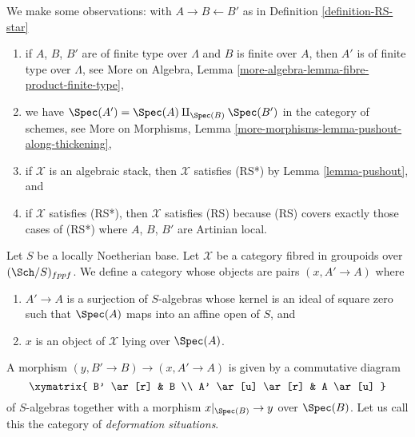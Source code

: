 \noindent
We make some observations:
with $A \to B \leftarrow B'$ as in Definition \ref{definition-RS-star}
\begin{enumerate}
\item if $A$, $B$, $B'$ are of finite type over $\Lambda$ and
$B$ is finite over $A$, then $A'$ is of finite type over $\Lambda$, see
More on Algebra, Lemma \ref{more-algebra-lemma-fibre-product-finite-type},
\item we have $\Spec(A') = \Spec(A) \amalg_{\Spec(B)} \Spec(B')$
in the category of schemes, see
More on Morphisms, Lemma \ref{more-morphisms-lemma-pushout-along-thickening},
\item if $\mathcal{X}$ is an algebraic stack, then $\mathcal{X}$ satisfies
(RS*) by Lemma \ref{lemma-pushout}, and
\item if $\mathcal{X}$ satisfies
(RS*), then $\mathcal{X}$ satisfies (RS) because (RS) covers exactly those
cases of (RS*) where $A$, $B$, $B'$ are Artinian local.
\end{enumerate}
Let $S$ be a locally Noetherian base. Let $\mathcal{X}$ be a category fibred
in groupoids over $(\Sch/S)_{fppf}$. We define a category whose objects are
pairs $(x, A' \to A)$ where
\begin{enumerate}
\item $A' \to A$ is a surjection of $S$-algebras whose kernel
is an ideal of square zero such that $\Spec(A)$ maps into an affine open
of $S$, and
\item $x$ is an object of $\mathcal{X}$ lying over $\Spec(A)$.
\end{enumerate}
A morphism $(y, B' \to B) \to (x, A' \to A)$ is given by a commutative
diagram
$$
\xymatrix{
B' \ar[r] & B \\
A' \ar[u] \ar[r] & A \ar[u]
}
$$
of $S$-algebras together with a morphism $x|_{\Spec(B)} \to y$ over
$\Spec(B)$. Let us call this the category of {\it deformation situations}.

